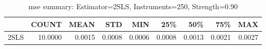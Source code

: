 \begin{table}[ht]
\centering
\caption{mse summary: Estimator=2SLS, Instruments=250, Strength=0.90}
\begin{tabular}{lrrrrrrrr}
\toprule
 & COUNT & MEAN & STD & MIN & 25\% & 50\% & 75\% & MAX \\
\midrule
2SLS & 10.0000 & 0.0015 & 0.0008 & 0.0006 & 0.0008 & 0.0013 & 0.0021 & 0.0027 \\
\bottomrule
\end{tabular}
\end{table}
